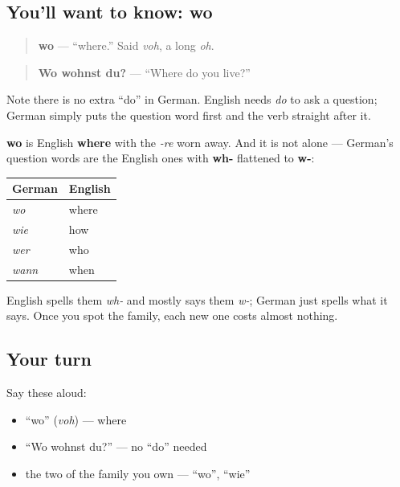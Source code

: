 \subsection*{You'll want to know: wo}
\begin{quote}
\textbf{wo} — \textquotedblleft{}where.\textquotedblright{} Said \emph{voh}, a long \emph{oh}.
\end{quote}

\begin{quote}
\textbf{Wo wohnst du?} — \textquotedblleft{}Where do you live?\textquotedblright{}
\end{quote}

Note there is no extra \textquotedblleft{}do\textquotedblright{} in German. English needs \emph{do} to ask a question; German simply puts the question word first and the verb straight after it.

\begin{cousinweb}
\textbf{wo} is English \textbf{where} with the \emph{-re} worn away. And it is not alone — German's question words are the English ones with \textbf{wh-} flattened to \textbf{w-}:

\noindent
\begin{tabularx}{\linewidth}{@{}>{\raggedright\arraybackslash}X>{\raggedright\arraybackslash}X@{}}
\toprule
\textbf{German} & \textbf{English} \\
\midrule
\emph{wo} & where \\
\emph{wie} & how \\
\emph{wer} & who \\
\emph{wann} & when \\
\bottomrule
\end{tabularx}

English spells them \emph{wh-} and mostly says them \emph{w-}; German just spells what it says. Once you spot the family, each new one costs almost nothing.
\end{cousinweb}

\subsection*{Your turn}
Say these aloud:

\begin{itemize}
\raggedright
  \item \textquotedblleft{}wo\textquotedblright{} (\emph{voh}) — where
  \item \textquotedblleft{}Wo wohnst du?\textquotedblright{} — no \textquotedblleft{}do\textquotedblright{} needed
  \item the two of the family you own — \textquotedblleft{}wo\textquotedblright{}, \textquotedblleft{}wie\textquotedblright{}
\end{itemize}

